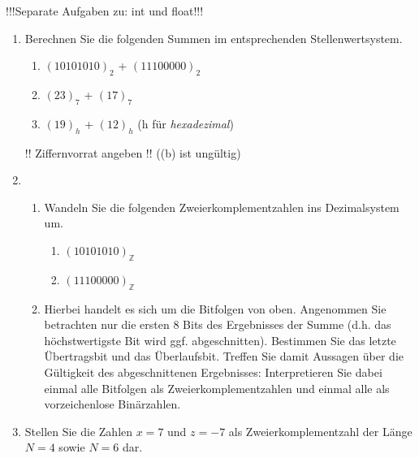 !!!Separate Aufgaben zu: int und float!!!
\begin{enumerate}
	\item Berechnen Sie die folgenden Summen im entsprechenden Stellenwertsystem.
		\begin{enumerate}
			\item  $(10101010)_2$ + $(11100000)_2$
			\item $(23)_7$ + $(17)_7$
			\item $(19)_{h}$ + $(12)_{h}$ (h für \textit{hexadezimal})
		\end{enumerate}
	!! Ziffernvorrat angeben !! ((b) ist ungültig)
	\item 
	\begin{enumerate}
		\item Wandeln Sie die folgenden Zweierkomplementzahlen ins Dezimalsystem um.
		\begin{enumerate}
			\item $(10101010)_{\mathbb{Z}}$
			\item $(11100000)_{\mathbb{Z}}$
		\end{enumerate}
		\item Hierbei handelt es sich um die Bitfolgen von oben. Angenommen Sie betrachten nur die ersten 8 Bits des Ergebnisses der Summe (d.h. das höchstwertigste Bit wird ggf. abgeschnitten). Bestimmen Sie das letzte Übertragsbit und das Überlaufsbit.  Treffen Sie damit Aussagen über die Gültigkeit des abgeschnittenen Ergebnisses: Interpretieren Sie dabei einmal alle Bitfolgen als Zweierkomplementzahlen und einmal alle als vorzeichenlose Binärzahlen.
	\end{enumerate}
	\item Stellen Sie die Zahlen $x = 7$ und $z = -7$ als Zweierkomplementzahl der Länge $N = 4$ sowie $N = 6$ dar.
\end{enumerate}
